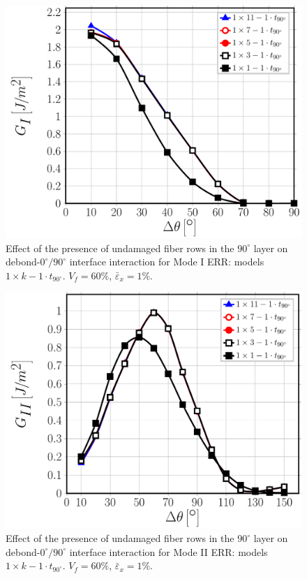 \documentclass[review]{elsarticle}
\begin{document}
\begin{figure}[!htb]
\centering
\includegraphics[height=0.375\textheight]{1xk-1-vf60-GI.pdf}
\caption{Effect of the presence of undamaged fiber rows in the $90^{\circ}$ layer on debond-$0^{\circ}/90^{\circ}$ interface interaction for Mode I ERR: models $1\times k-1\cdot t_{90^{\circ}}$. $V_{f}=60\%$, $\bar{\varepsilon}_{x}=1\%$.}\label{fig:1kGI}
\end{figure}

\begin{figure}[!htb]
\centering
\includegraphics[height=0.375\textheight]{1xk-1-vf60-GII.pdf}
\caption{Effect of the presence of undamaged fiber rows in the $90^{\circ}$ layer on debond-$0^{\circ}/90^{\circ}$ interface interaction for Mode II ERR: models $1\times k-1\cdot t_{90^{\circ}}$. $V_{f}=60\%$, $\bar{\varepsilon}_{x}=1\%$.}\label{fig:1kGII}
\end{figure}
\end{document}

